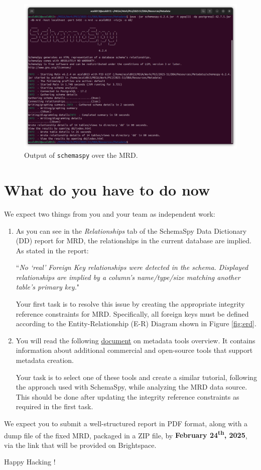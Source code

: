 \documentclass{article}
\begin{document}
\begin{enumerate}
    \begin{figure}[t]
        \includegraphics[width=\textwidth]{output.png}
        \caption{Output of \texttt{schemaspy} over the MRD.}
        \label{fig:output}
    \end{figure}

\end{enumerate}

\section{What do you have to do now}
We expect two things from you and your team as independent work:

\begin{enumerate}
    \item As you can see in the \textit{Relationships} tab of the SchemaSpy Data Dictionary (DD) report for MRD, the relationships in the current database are implied. As stated in the report:

    ``\textit{No `real' Foreign Key relationships were detected in the schema. Displayed relationships are implied by a column's name/type/size matching another table's primary key.}"

    Your first task is to resolve this issue by creating the appropriate integrity reference constraints for MRD. Specifically, all foreign keys must be defined according to the Entity-Relationship (E-R) Diagram shown in Figure \ref{fig:erd}.

    \item You will read the following \href{https://drive.google.com/file/d/1jqnAJ4A3AfnrTHHuYTcmOlaBXnUAznP1/view?usp=drive_link}{document} on metadata tools overview. It contains information about additional commercial and open-source tools that support metadata creation.

    Your task is to select one of these tools and create a similar tutorial, following the approach used with SchemaSpy, while analyzing the MRD data source. This should be done after updating the integrity reference constraints as required in the first task.
\end{enumerate}

We expect you to submit a well-structured report in PDF format, along with a dump file of the fixed MRD, packaged in a ZIP file, by \textbf{February 24\textsuperscript{th}, 2025}, via the link that will be provided on Brightspace.

\vspace{5mm}
Happy Hacking \smiley!
\end{document}
